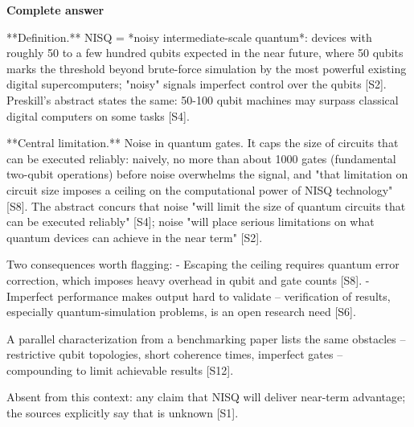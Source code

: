 \documentclass[10pt]{article}
\begin{document}
\textbf{Complete answer}
\begin{AnswerText}
**Definition.** NISQ = *noisy intermediate-scale quantum*: devices with roughly 50 to a few hundred qubits expected in the near future, where 50 qubits marks the threshold beyond brute-force simulation by the most powerful existing digital supercomputers; "noisy" signals imperfect control over the qubits [S2]. Preskill's abstract states the same: 50-100 qubit machines may surpass classical digital computers on some tasks [S4].

**Central limitation.** Noise in quantum gates. It caps the size of circuits that can be executed reliably: naively, no more than about 1000 gates (fundamental two-qubit operations) before noise overwhelms the signal, and "that limitation on circuit size imposes a ceiling on the computational power of NISQ technology" [S8]. The abstract concurs that noise "will limit the size of quantum circuits that can be executed reliably" [S4]; noise "will place serious limitations on what quantum devices can achieve in the near term" [S2].

Two consequences worth flagging:
- Escaping the ceiling requires quantum error correction, which imposes heavy overhead in qubit and gate counts [S8].
- Imperfect performance makes output hard to validate -- verification of results, especially quantum-simulation problems, is an open research need [S6].

A parallel characterization from a benchmarking paper lists the same obstacles -- restrictive qubit topologies, short coherence times, imperfect gates -- compounding to limit achievable results [S12].

Absent from this context: any claim that NISQ will deliver near-term advantage; the sources explicitly say that is unknown [S1].
\end{AnswerText}
\end{document}
